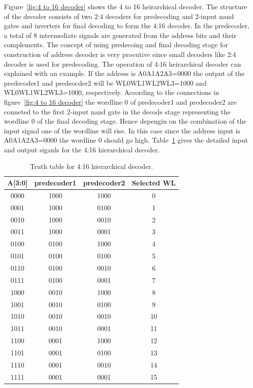 Figure~\ref{fig:4 to 16 decoder} shows the 4 to 16 heirarchical decoder. The structure of the decoder consists of two 2:4 decoders for predecoding and 2-input nand gates and inverters for final decoding to form the 4:16 decoder.
In the predecoder, a total of 8 intermediate signals are generated from the address bits and their complements.
The concept of using predecoing and final decoding stage for construction of address decoder is very procutive since small
decoders like 2:4 decoder is used for predecoding. The operation of 4:16 heirarchical decoder can explained with an example. If the address is A0A1A2A3=0000 the output of the predecoder1 and predeocder2 will be
WL0WL1WL2WL3=1000 and WL0WL1WL2WL3=1000, respectively. According to the connections in figure~\ref{fig:4 to 16 decoder} the wordline 0 of predecoder1 and predecoder2 are conneted 
to the first 2-input nand gate in the decode stage representing the wordline 0 of the final decoding stage. Hence depengin on the combination
of the input signal one of the wordline will rise. In this case since the address input is A0A1A2A3=0000 the wordline 0 should go high. Table~\ref{table:4-16 hierarchical_decoder} gives the detailed input and output siganls
for the 4:16 hierarchical decoder.


 \begin{table}[h!] 
   \begin{center}
     \begin{tabular}{| c | c | c | c |}
     \hline
     A[3:0] & predecoder1 & predecoder2 & Selected WL\\ \hline
     0000 & 1000 & 1000 & 0\\ \hline
     0001 & 1000 & 0100 & 1\\ \hline
     0010 & 1000 & 0010 & 2\\ \hline
     0011 & 1000 & 0001 & 3\\ \hline
     0100 & 0100 & 1000 & 4\\ \hline
     0101 & 0100 & 0100 & 5\\ \hline
     0110 & 0100 & 0010 & 6\\ \hline
     0111 & 0100 & 0001 & 7\\ \hline
     1000 & 0010 & 1000 & 8\\ \hline
     1001 & 0010 & 0100 & 9\\ \hline
     1010 & 0010 & 0010 & 10\\ \hline
     1011 & 0010 & 0001 & 11\\ \hline
     1100 & 0001 & 1000 & 12\\ \hline
     1101 & 0001 & 0100 & 13\\ \hline
     1110 & 0001 & 0010 & 14\\ \hline
     1111 & 0001 & 0001 & 15\\ \hline
     \end{tabular}
   \end{center}
   \caption{Truth table for 4:16 hierarchical decoder.}
   \label{table:4-16 hierarchical_decoder}
 \end{table}


